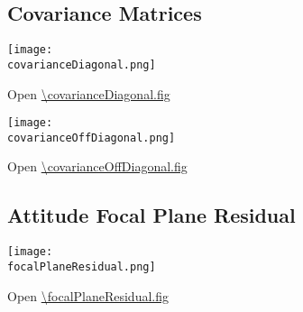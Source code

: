 \subsection{Covariance Matrices}

\begin{center}
  \texttt{[image: \\covarianceDiagonal.png]}
\end{center}
Open \url{\covarianceDiagonal.fig}

\begin{center}
  \texttt{[image: \\covarianceOffDiagonal.png]}
\end{center}
Open \url{\covarianceOffDiagonal.fig}

\subsection{Attitude Focal Plane Residual}

\begin{center}
  \texttt{[image: \\focalPlaneResidual.png]}
\end{center}
Open \url{\focalPlaneResidual.fig}
